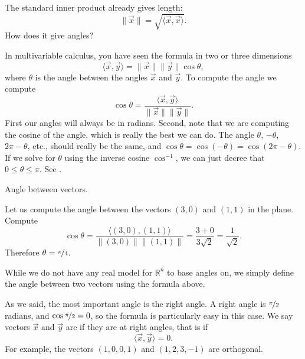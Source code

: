 The standard inner product already gives length:
\begin{equation*}
\lVert{\vec{x}}\rVert = \sqrt{\langle \vec{x}, \vec{x} \rangle} .
\end{equation*}
How does it give angles?

In multivariable calculus, you have seen the 
formula in two or three dimensions
\begin{equation*}
\langle \vec{x}, \vec{y} \rangle
=
\lVert{\vec{x}}\rVert \lVert{\vec{y}}\rVert \cos \theta,
\end{equation*}
where $\theta$ is the angle between the angles $\vec{x}$ and $\vec{y}$.  To
compute the angle we compute
\begin{equation*}
\cos \theta
=
\frac{\langle \vec{x}, \vec{y} \rangle}{\lVert{\vec{x}}\rVert
\lVert{\vec{y}}\rVert} .
\end{equation*}
First our angles will always be in radians.
Second, note that we are computing the cosine of the angle,
which is really the best
we can do.  The angle $\theta$, $-\theta$, $2\pi-\theta$, etc., should really be
the same, and $\cos \theta = \cos (-\theta) = \cos(2\pi - \theta)$.
If we solve for $\theta$ using the inverse cosine $\cos^{-1}$,
we can just decree that $0 \leq \theta \leq \pi$.  See
.

\begin{myfig}
\capstart
{}
\caption{Angle between vectors.\label{vec-angle:fig}}
\end{myfig}

\begin{example}
Let us compute the angle between the vectors $(3,0)$ and $(1,1)$ in the
plane.
Compute
\begin{equation*}
\cos \theta =
\frac{\bigl\langle (3,0) , (1,1) \bigr\rangle}{\lVert(3,0)\rVert \lVert(1,1)\rVert}
=
\frac{3 + 0}{3 \sqrt{2}} = \frac{1}{\sqrt{2}} .
\end{equation*}
Therefore $\theta = \nicefrac{\pi}{4}$.
\end{example}

While we do not have any real model for ${\mathbb{R}}^n$ to base angles on,
we simply define the angle between two vectors using the formula above.

\medskip

As we said, the most important angle is the right angle.  A right angle
is $\nicefrac{\pi}{2}$ radians, and $\cos \nicefrac{\pi}{2} = 0$, so the
formula is particularly easy in this case.
We say
vectors $\vec{x}$ and $\vec{y}$
are \emph{} if they are at right
angles, that is if
\begin{equation*}
\langle \vec{x} , \vec{y} \rangle
=
0 .
\end{equation*}
For example, the vectors $(1,0,0,1)$ and $(1,2,3,-1)$ are orthogonal.

